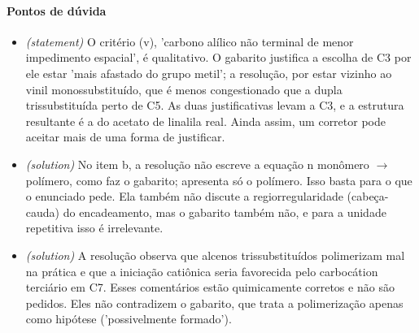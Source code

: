 \documentclass{article}%
\begin{document}
\paragraph{Pontos de dúvida}%
\begin{itemize}%
\item%
\textit{(statement)} O critério (v), 'carbono alílico não terminal de menor impedimento espacial', é qualitativo. O gabarito justifica a escolha de C3 por ele estar 'mais afastado do grupo metil'; a resolução, por estar vizinho ao vinil monossubstituído, que é menos congestionado que a dupla trissubstituída perto de C5. As duas justificativas levam a C3, e a estrutura resultante é a do acetato de linalila real. Ainda assim, um corretor pode aceitar mais de uma forma de justificar.%
\item%
\textit{(solution)} No item b, a resolução não escreve a equação n monômero $\to$ polímero, como faz o gabarito; apresenta só o polímero. Isso basta para o que o enunciado pede. Ela também não discute a regiorregularidade (cabeça{-}cauda) do encadeamento, mas o gabarito também não, e para a unidade repetitiva isso é irrelevante.%
\item%
\textit{(solution)} A resolução observa que alcenos trissubstituídos polimerizam mal na prática e que a iniciação catiônica seria favorecida pelo carbocátion terciário em C7. Esses comentários estão quimicamente corretos e não são pedidos. Eles não contradizem o gabarito, que trata a polimerização apenas como hipótese ('possivelmente formado').%
\end{itemize}%
\end{document}
